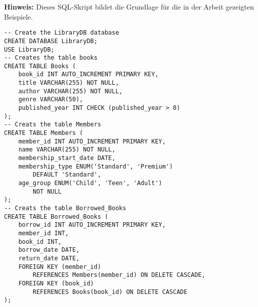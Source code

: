 \label{sec:library_db}
\textbf{Hinweis:} Dieses SQL-Skript bildet die Grundlage für die in der
Arbeit gezeigten Beispiele.

\begin{lstlisting}[caption={SQL Skript LibraryDB}, label={list:skript_library_db}]
-- Create the LibraryDB database
CREATE DATABASE LibraryDB;
USE LibraryDB;
-- Creates the table books
CREATE TABLE Books (
    book_id INT AUTO_INCREMENT PRIMARY KEY,
    title VARCHAR(255) NOT NULL,
    author VARCHAR(255) NOT NULL,
    genre VARCHAR(50),
    published_year INT CHECK (published_year > 0)
);
-- Creats the table Members
CREATE TABLE Members (
    member_id INT AUTO_INCREMENT PRIMARY KEY,
    name VARCHAR(255) NOT NULL,
    membership_start_date DATE,
    membership_type ENUM('Standard', 'Premium')
        DEFAULT 'Standard',
    age_group ENUM('Child', 'Teen', 'Adult')
        NOT NULL
);
-- Creats the table Borrowed_Books
CREATE TABLE Borrowed_Books (
    borrow_id INT AUTO_INCREMENT PRIMARY KEY,
    member_id INT,
    book_id INT,
    borrow_date DATE,
    return_date DATE,
    FOREIGN KEY (member_id)
        REFERENCES Members(member_id) ON DELETE CASCADE,
    FOREIGN KEY (book_id)
        REFERENCES Books(book_id) ON DELETE CASCADE
);
\end{lstlisting}